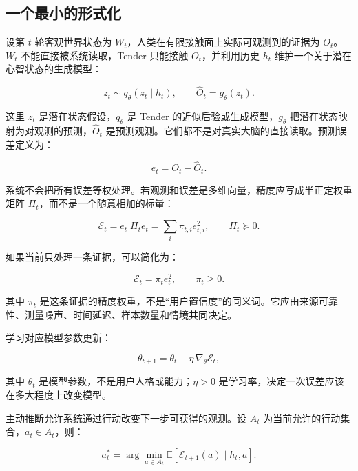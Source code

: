 \documentclass[UTF8,a4paper,11pt]{ctexart}
\begin{document}
\subsection{一个最小的形式化}

设第 \(t\) 轮客观世界状态为 \(W_t\)，人类在有限接触面上实际可观测到的证据为 \(O_t\)。\(W_t\) 不能直接被系统读取，Tender 只能接触 \(O_t\)，并利用历史 \(h_t\) 维护一个关于潜在心智状态的生成模型：

\begin{equation}
z_t \sim q_\theta(z_t\mid h_t),\qquad
\hat O_t=g_\theta(z_t).
\end{equation}

这里 \(z_t\) 是潜在状态假设，\(q_\theta\) 是 Tender 的近似后验或生成模型，\(g_\theta\) 把潜在状态映射为对观测的预测，\(\hat O_t\) 是预测观测。它们都不是对真实大脑的直接读取。预测误差定义为：

\begin{equation}
e_t=O_t-\hat O_t.
\end{equation}

系统不会把所有误差等权处理。若观测和误差是多维向量，精度应写成半正定权重矩阵 \(\Pi_t\)，而不是一个随意相加的标量：

\begin{equation}
\mathcal E_t
=e_t^{\top}\Pi_t e_t
=\sum_i \pi_{t,i}e_{t,i}^{2},
\qquad \Pi_t\succeq 0.
\end{equation}

如果当前只处理一条证据，可以简化为：

\begin{equation}
\mathcal E_t=\pi_t e_t^2,
\qquad \pi_t\geq 0.
\end{equation}

其中 \(\pi_t\) 是这条证据的精度权重，不是“用户置信度”的同义词。它应由来源可靠性、测量噪声、时间延迟、样本数量和情境共同决定。

学习对应模型参数更新：

\begin{equation}
\theta_{t+1}
=\theta_t-\eta\,\nabla_\theta\mathcal E_t,
\end{equation}

其中 \(\theta_t\) 是模型参数，不是用户人格或能力；\(\eta>0\) 是学习率，决定一次误差应该在多大程度上改变模型。

主动推断允许系统通过行动改变下一步可获得的观测。设 \(A_t\) 为当前允许的行动集合，\(a_t\in A_t\)，则：

\begin{equation}
a_t^\ast
=\arg\min_{a\in A_t}
\mathbb E\left[
\mathcal E_{t+1}(a)\mid h_t,a
\right].
\end{equation}
\end{document}
